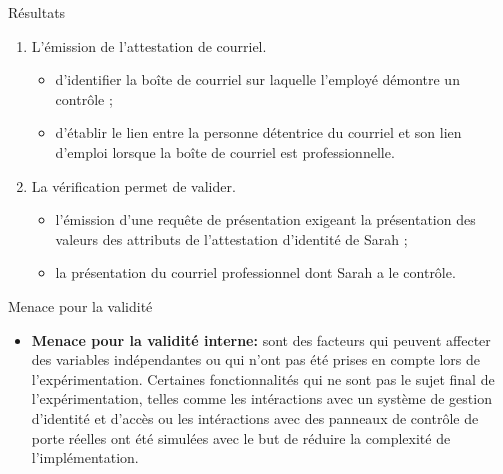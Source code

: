 \documentclass[final]{beamer}
\newlength{\onecolwid}
\newlength{\twocolwid}
\begin{document}
\begin{frame}[t]
\begin{columns}[t]
\begin{column}{\twocolwid}
\begin{columns}[t,totalwidth=\twocolwid]
\begin{column}{\onecolwid}
\begin{block}{Résultats}
\begin{enumerate}
\item L'émission de l'attestation de courriel.
    \begin{itemize}
        \item d'identifier la boîte de courriel sur laquelle l'employé démontre un contrôle ;
        \item d'établir le lien entre la personne détentrice du courriel et son lien d'emploi lorsque la boîte de courriel est professionnelle.
    \end{itemize}

\item La vérification permet de valider.
    \begin{itemize}
        \item l'émission d'une requête de présentation exigeant la présentation des valeurs des attributs de l'attestation d'identité de Sarah ;
        \item la présentation du courriel professionnel dont Sarah a le contrôle.
    \end{itemize}
\end{enumerate}

\end{block}




\begin{block}{Menace pour la validité}


\begin{itemize}
    \item \textbf{Menace pour la validité interne:} sont des facteurs qui peuvent affecter des variables indépendantes ou qui n'ont pas été prises en compte lors de l'expérimentation. Certaines fonctionnalités qui ne sont pas le sujet final de l'expérimentation, telles comme les intéractions avec un système de gestion d'identité et d'accès ou les intéractions avec des panneaux de contrôle de porte réelles ont été simulées avec le but de réduire la complexité de l'implémentation.  
    
\end{itemize}
    
\end{block}


\end{column}
\end{columns}
\end{column}
\end{columns}
\end{frame}
\end{document}
